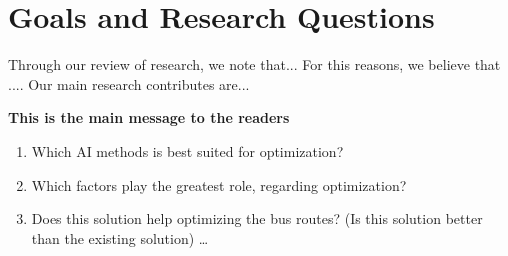 \section{Goals and Research Questions}

Through our review of research, we note that...
For this reasons, we believe that .... 
Our main research contributes are...

\textbf{This is the main message to the readers}
\begin{enumerate}
  \item Which AI methods is best suited for optimization?
  \item Which factors play the greatest role, regarding optimization?
  \item Does this solution help optimizing the bus routes? (Is this solution better than the existing solution)
   \ldots
\end{enumerate}